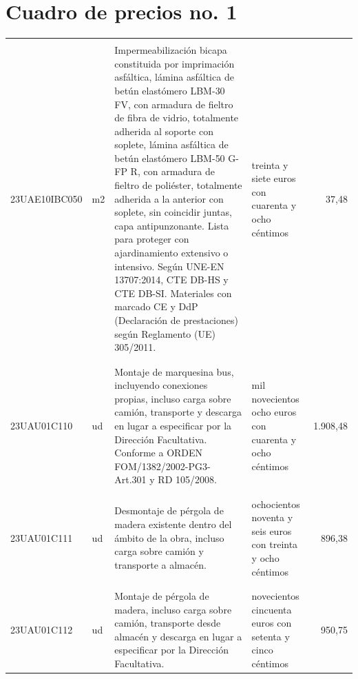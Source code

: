 \part{Cuadro de precios no. 1}%
\label{sec:Cuadrodepreciosno.1}%
\parttoc%
\setcounter{chapter}{0}%
\small%
%
%
%
\tablelasttail{\hline%
}%
\begin{supertabular}{|l|l|p{5cm}|p{3cm}|r|}%
&&&&\\%
23UAE10IBC050&m2&Impermeabilización bicapa constituida por imprimación asfáltica, lámina asfáltica de betún elastómero LBM{-}30 FV, con armadura de fieltro de fibra de vidrio, totalmente adherida al soporte con soplete, lámina asfáltica de betún elastómero LBM{-}50 G{-}FP R, con armadura de fieltro de poliéster, totalmente adherida a la anterior con soplete, sin coincidir juntas, capa antipunzonante. Lista para proteger con ajardinamiento extensivo o intensivo. Según UNE{-}EN 13707:2014, CTE DB{-}HS y CTE DB{-}SI. Materiales con marcado CE y DdP (Declaración de prestaciones) según Reglamento (UE) 305/2011.&treinta y siete euros con cuarenta y ocho céntimos&37,48\\%
&&&&\\%
&&&&\\%
23UAU01C110&ud&Montaje de marquesina bus, incluyendo conexiones propias, incluso carga sobre camión, transporte y descarga en lugar a especificar por la Dirección Facultativa. Conforme a ORDEN FOM/1382/2002{-}PG3{-}Art.301 y RD 105/2008.&mil novecientos ocho euros con cuarenta y ocho céntimos&1.908,48\\%
&&&&\\%
&&&&\\%
23UAU01C111&ud&Desmontaje de pérgola de madera existente dentro del ámbito de la obra, incluso carga sobre camión y transporte a almacén.&ochocientos noventa y seis euros con treinta y ocho céntimos&896,38\\%
&&&&\\%
&&&&\\%
23UAU01C112&ud&Montaje de pérgola de madera, incluso carga sobre camión, transporte desde almacén y descarga en lugar a especificar por la Dirección Facultativa.&novecientos cincuenta euros con setenta y cinco céntimos&950,75\\%

\end{supertabular}
